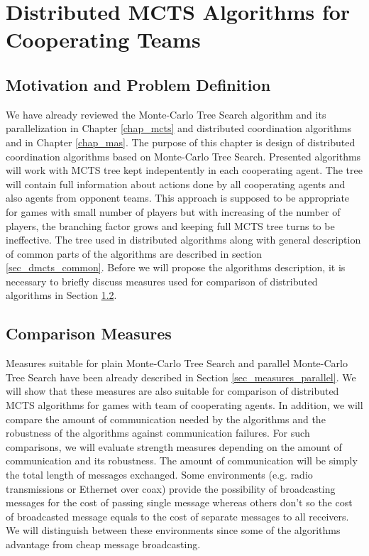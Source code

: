 \chapter{Distributed MCTS Algorithms for Cooperating Teams}
\label{chap_dmcts_design}

\section{Motivation and Problem Definition}


We have already reviewed the Monte-Carlo Tree Search algorithm and its parallelization in
 Chapter \ref{chap_mcts} and distributed coordination algorithms and in Chapter \ref{chap_mas}.
 The purpose of this chapter is design of distributed coordination algorithms based on
 Monte-Carlo Tree Search. Presented algorithms will work with MCTS tree kept indepentently in
 each cooperating agent. The tree will contain full information about actions done by all
 cooperating agents and also agents from opponent teams. This approach is supposed to be
 appropriate for games with small number of players but with increasing of the number of
 players, the branching factor grows and keeping full MCTS tree turns to be ineffective. The
 tree used in distributed algorithms along with general description of common parts of the
 algorithms are described in section \ref{sec_dmcts_common}. Before we will propose the
 algorithms description, it is necessary to briefly discuss measures used for comparison of
 distributed algorithms in Section \ref{sec_measures_distributed}. 



\section{Comparison Measures}
\label{sec_measures_distributed}

Measures suitable for plain Monte-Carlo Tree Search and parallel
Monte-Carlo Tree Search have been already described in Section \ref{sec_measures_parallel}.
We will show that these
measures are also suitable for comparison of distributed MCTS algorithms for games with team
of cooperating agents. In addition, we will compare the amount of communication needed by the
algorithms and the robustness of the algorithms against communication failures. For such
comparisons, we will evaluate strength measures depending on the amount of communication and
its robustness. The amount of communication will be simply the total length of messages
exchanged. Some environments (e.g. radio transmissions or Ethernet over coax) provide the 
possibility of broadcasting messages for the cost of passing single message whereas others 
don't so the cost of broadcasted message equals to the cost of separate messages to all
receivers. We will distinguish between these
environments since some of the algorithms advantage from cheap message broadcasting.

